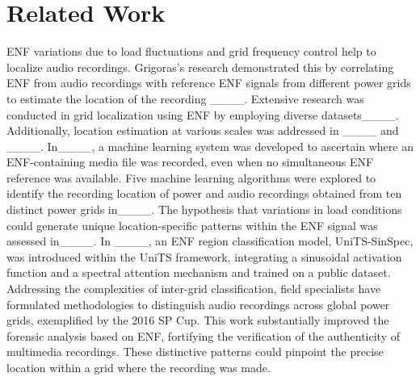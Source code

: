 \section{Related Work}
\label{sec:relatedWork}

ENF variations due to load fluctuations and grid frequency control help to localize audio recordings. Grigoras's research demonstrated this by correlating ENF from audio recordings with reference ENF signals from different power grids to estimate the location of the recording ____. Extensive research was conducted in grid localization using ENF by employing diverse datasets____. Additionally, location estimation at various scales was addressed in ____ and ____. In____, a machine learning system was developed to ascertain where an ENF-containing media file was recorded, even when no simultaneous ENF reference was available. Five machine learning algorithms were explored to identify the recording location of power and audio recordings obtained from ten distinct power grids in____. The hypothesis that variations in load conditions could generate unique location-specific patterns within the ENF signal was assessed in____. In ____, an ENF region classification model, UniTS-SinSpec, was introduced within the UniTS framework, integrating a sinusoidal activation function and a spectral attention mechanism and trained on a public dataset. Addressing the complexities of inter-grid classification, field specialists have formulated methodologies to distinguish audio recordings across global power grids, exemplified by the 2016 SP Cup. This work substantially improved the forensic analysis based on ENF, fortifying the verification of the authenticity of multimedia recordings. These distinctive patterns could pinpoint the precise location within a grid where the recording was made.
